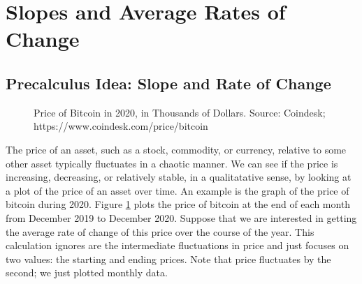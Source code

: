 \section{Slopes and Average Rates of Change}
\label{sec:slope}

\subsection{Precalculus Idea: Slope and Rate of Change}

\begin{figure}
  \vspace{-20pt}
\centering
{}
\caption{Price of Bitcoin in 2020, in Thousands of Dollars. Source: Coindesk; https://www.coindesk.com/price/bitcoin}
\label{fig:2-1-bitcoin2020}
\end{figure}
The price of an asset, such as a stock, commodity, or currency, relative to some other asset typically fluctuates in a chaotic manner. We can see if the price is increasing, decreasing, or relatively stable, in a qualitatative sense, by looking at a plot of the price of an asset over time. An example is the graph of the price of bitcoin during 2020. Figure \ref{fig:2-1-bitcoin2020} plots the price of bitcoin at the end of each month from December 2019 to December 2020. Suppose that we are interested in getting the average rate of change of this price over the course of the year. This calculation ignores are the intermediate fluctuations in price and just focuses on two values: the starting and ending prices. Note that price fluctuates by the second; we just plotted monthly data.


